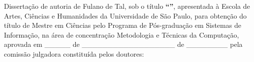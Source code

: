 \documentclass[
	12pt,				%
	oneside,			%
	a4paper,			%
	english,			%
	brazil				%
	]{abntex2ppgsi}
\begin{document}

\begin{folhadeaprovacao}
%
%
%
%
\noindent Dissertação de autoria de Fulano de Tal, sob o título \textbf{``\imprimirtitulo''}, apresentada à Escola de Artes, Ciências e Humanidades da Universidade de São Paulo, para obtenção do título de Mestre em Ciências pelo Programa de Pós-graduação em Sistemas de Informação, na área de concentração Metodologia e Técnicas da Computação, aprovada em \_\_\_\_\_ de \_\_\_\_\_\_\_\_\_\_\_\_\_\_\_\_\_\_ de \_\_\_\_\_\_\_\_ pela comissão julgadora constituída pelos doutores:

\vspace*{3cm}


\end{folhadeaprovacao}
\end{document}
